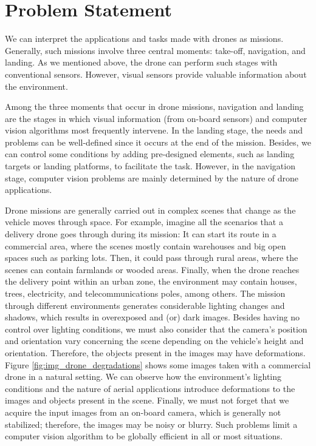 \section*{Problem Statement}
 
We can interpret the applications and tasks made with drones as missions. Generally, such missions involve three central moments: take-off, navigation, and landing. As we mentioned above, the drone can perform such stages with conventional sensors. However, visual sensors provide valuable information about the environment.

Among the three moments that occur in drone missions, navigation and landing are the stages in which visual information (from on-board sensors) and computer vision algorithms most frequently intervene. In the landing stage, the needs and problems can be well-defined since it occurs at the end of the mission. Besides, we can control some conditions by adding pre-designed elements, such as landing targets or landing platforms, to facilitate the task. However, in the navigation stage, computer vision problems are mainly determined by the nature of drone applications.

Drone missions are generally carried out in complex scenes that change as the vehicle moves through space. For example, imagine all the scenarios that a delivery drone goes through during its mission: It can start its route in a commercial area, where the scenes mostly contain warehouses and big open spaces such as parking lots. Then, it could pass through rural areas, where the scenes can contain farmlands or wooded areas. Finally, when the drone reaches the delivery point within an urban zone, the environment may contain houses, trees, electricity, and telecommunications poles, among others. The mission through different environments generates considerable lighting changes and shadows, which results in overexposed and (or) dark images. Besides having no control over lighting conditions, we must also consider that the camera's position and orientation vary concerning the scene depending on the vehicle's height and orientation. Therefore, the objects present in the images may have deformations. Figure \ref{fig:img_drone_degradations} shows some images taken with a commercial drone in a natural setting. We can observe how the environment's lighting conditions and the nature of aerial applications introduce deformations to the images and objects present in the scene. Finally, we must not forget that we acquire the input images from an on-board camera, which is generally not stabilized; therefore, the images may be noisy or blurry. Such problems limit a computer vision algorithm to be globally efficient in all or most situations.


